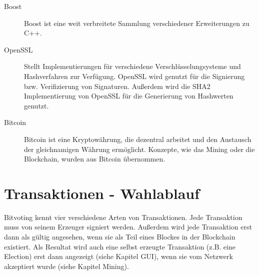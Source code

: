 \documentclass[colorback,accentcolor=tud1b]{tudreport}
\begin{document}
\begin{description}
\item[Boost] Boost ist eine weit verbreitete Sammlung verschiedener Erweiterungen zu C++.

\item[OpenSSL] Stellt Implementierungen für verschiedene Verschlüsselungsysteme und Hashverfahren zur Verfügung. OpenSSL wird genutzt für die Signierung bzw. Verifizierung von Signaturen. Außerdem wird die SHA2 Implementierung von OpenSSL für die Generierung von Hashwerten genutzt.

\item[Bitcoin] Bitcoin ist eine Kryptowährung, die dezentral arbeitet und den Austausch der gleichnamigen Währung ermöglicht. Konzepte, wie das Mining oder die Blockchain, wurden aus Bitcoin übernommen.
\end{description}
\section{Transaktionen - Wahlablauf}
Bitvoting kennt vier verschiedene Arten von Transaktionen. Jede Transaktion muss von seinem Erzeuger signiert werden. Außerdem wird jede Transaktion erst dann als gültig angesehen, wenn sie als Teil eines Blockes in der Blockchain existiert. Als Resultat wird auch eine selbst erzeugte Transaktion (z.B. eine Election) erst dann angezeigt (siehe Kapitel GUI), wenn sie vom Netzwerk akzeptiert wurde (siehe Kapitel Mining). 
\end{document}
